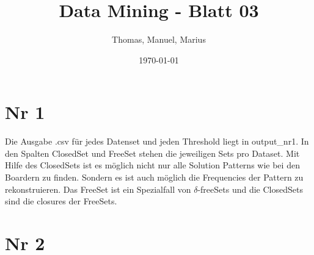 \documentclass{article}
\title{Data Mining - Blatt 03}
\author{Thomas, Manuel, Marius}
\date{\today}
\begin{document}
\maketitle

\section{Nr 1}
Die Ausgabe .csv für jedes Datenset und jeden Threshold liegt in output\_nr1. In den Spalten ClosedSet und FreeSet
stehen die jeweiligen Sets pro Dataset. Mit Hilfe des ClosedSets ist es möglich nicht nur alle Solution Patterns wie
bei den Boardern zu finden. Sondern es ist auch möglich die Frequencies der Pattern zu rekonstruieren. Das FreeSet ist
ein Spezialfall von $\delta$-freeSets und die ClosedSets sind die closures der FreeSets.

\section{Nr 2}
\end{document}
